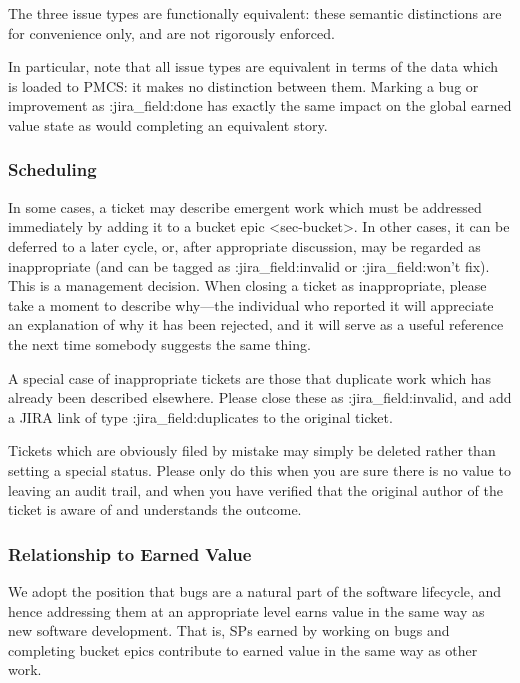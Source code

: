 The three issue types are functionally equivalent: these semantic
distinctions are for convenience only, and are not rigorously enforced.

In particular, note that all issue types are equivalent in terms of the
data which is loaded to PMCS: it makes no distinction between them.
Marking a bug or improvement as :jira\_field:done has exactly the same
impact on the global earned value state as would completing an
equivalent story.

\subsubsection{Scheduling}\label{scheduling}

In some cases, a ticket may describe emergent work which must be
addressed immediately by adding it to a
bucket epic \textless{}sec-bucket\textgreater{}. In other cases, it can
be deferred to a later cycle, or, after appropriate discussion, may be
regarded as inappropriate (and can be tagged as :jira\_field:invalid or
:jira\_field:won't fix). This is a management decision. When closing a
ticket as inappropriate, please take a moment to describe why---the
individual who reported it will appreciate an explanation of why it has
been rejected, and it will serve as a useful reference the next time
somebody suggests the same thing.

A special case of inappropriate tickets are those that duplicate work
which has already been described elsewhere. Please close these as
:jira\_field:invalid, and add a JIRA link of type
:jira\_field:duplicates to the original ticket.

Tickets which are obviously filed by mistake may simply be deleted
rather than setting a special status. Please only do this when you are
sure there is no value to leaving an audit trail, and when you have
verified that the original author of the ticket is aware of and
understands the outcome.

\subsubsection{Relationship to Earned
Value}\label{relationship-to-earned-value}

We adopt the position that bugs are a natural part of the software
lifecycle, and hence addressing them at an appropriate level earns value
in the same way as new software development. That is, SPs earned by
working on bugs and completing bucket epics contribute to earned value
in the same way as other work.

